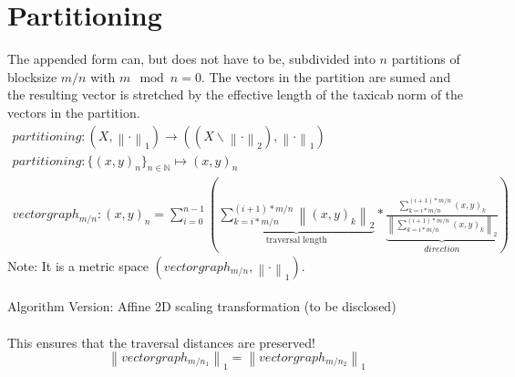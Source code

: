 \documentclass{report}
\newcommand\norm[1]{\left\lVert#1\right\rVert}
\begin{document}
\section{Partitioning}
The appended form can, but does not have to be, subdivided into $n$ partitions of blocksize $m/n$ with $m\mod n=0$. The vectors in the partition are sumed and the resulting vector is stretched by the effective length of the taxicab norm of the vectors in the partition.
\begin{align}
partitioning: (X,\norm{\cdot}_1) \rightarrow ((X\backslash\norm{\cdot}_2),\norm{\cdot}_1)\\
partitioning: \{(x,y)_{n}\}_{n \in \mathbb{N}} \mapsto (x,y)_n\\
vectorgraph_{m/n}:(x,y)_{n}=\sum_{i=0}^{n-1} (\underbrace{\sum_{k=i*m/n}^{(i+1)*m/n} \norm{(x,y)_{k}}_2}_{\text{traversal length}} * \underbrace{\frac{\sum_{k=i*m/n}^{(i+1)*m/n} (x,y)_{k}}{\norm{ \sum_{k=i*m/n}^{(i+1)*m/n} (x,y)_{k} }_2}}_{direction})
\end{align}
Note: It is a metric space $(vectorgraph_{m/n}, \norm{\cdot}_1)$.\\\\
Algorithm Version: Affine 2D scaling transformation (to be disclosed)\\\\
This ensures that the traversal distances are preserved!
\begin{equation}
\norm{vectorgraph_{m/n_{1}}}_{1}=\norm{vectorgraph_{m/n_{2}}}_{1}\label{eq:9}
\end{equation}
\end{document}
